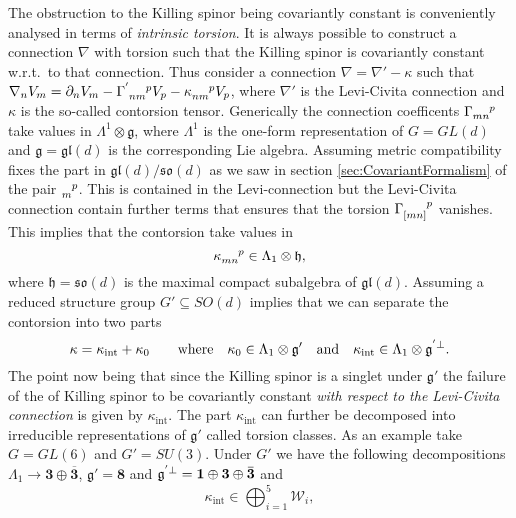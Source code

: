 The obstruction to the Killing spinor being covariantly constant is conveniently analysed in terms of \emph{intrinsic torsion}. It is always possible to construct a connection $\nabla$ with torsion such that the Killing spinor is covariantly constant w.r.t.\ to that connection. Thus consider a connection $\nabla=\nabla'-\kappa$ such that $\nabla_n V_m=\pd_nV_m-\tensor{\Gamma}{^'_{nm}^p}V_p-\tensor{\kappa}{_{nm}^p}V_p$, where $\nabla'$ is the Levi-Civita connection and $\kappa$ is the so-called contorsion tensor. Generically the connection coefficents $\tensor{\Gamma}{_{mn}^p}$ take values in $\Lambda^1\otimes\mathfrak{g}$, where $\Lambda^1$ is the one-form representation of $G=GL(d)$ and $\mathfrak{g}=\mathfrak{gl}(d)$ is the corresponding Lie algebra. Assuming metric compatibility fixes the part in $\mathfrak{gl}(d)/\mathfrak{so}(d)$ as we saw in section \ref{sec:CovariantFormalism} of the pair $\tensor{}{_m^p}$. This is contained in the Levi-connection but the Levi-Civita connection contain further terms that ensures that the torsion $\tensor{\Gamma}{_{[mn]}^p}$ vanishes. This implies that the contorsion take values in 
\begin{equation}
    \tensor{\kappa}{_{mn}^p}\in \Lambda_1\otimes \mathfrak{h},
\end{equation}
where $\mathfrak{h}=\mathfrak{so}(d)$ is the maximal compact subalgebra of $\mathfrak{gl}(d)$. Assuming a reduced structure group $G'\subseteq SO(d)$ implies that we can separate the contorsion into two parts 
\begin{equation}
    \kappa = \kappa_\text{int}+\kappa_{0}\qquad \text{where} \quad \kappa_{0}\in \Lambda_1\otimes \mathfrak{g}'\quad \text{and}\quad \kappa_{\text{int}}\in \Lambda_1\otimes \tensor{\mathfrak{g}}{^'^{\perp}}.
\end{equation}
The point now being that since the Killing spinor is a singlet under $\mathfrak{g}'$ the failure of the of Killing spinor to be covariantly constant \emph{with respect to the Levi-Civita connection} is given by $\kappa_{\text{int}}$. The part $\kappa_{\text{int}}$ can further be decomposed into irreducible representations of $\mathfrak{g}'$ called torsion classes. As an example take $G=GL(6)$ and $G'=SU(3)$. Under $G'$ we have the following decompositions $\Lambda_1\to \mathbf{3}\oplus\overbar{\mathbf{3}}$, $\mathfrak{g}'=\mathbf{8}$ and $\tensor{\mathfrak{g}}{^'^{\perp}}=\mathbf{1}\oplus\mathbf{3}\oplus\overbar{\mathbf{3}}$ and 
\begin{equation}
    \kappa_{\text{int}} \in \bigoplus_{i=1}^5 \mathscr{W}_i,
\end{equation}
